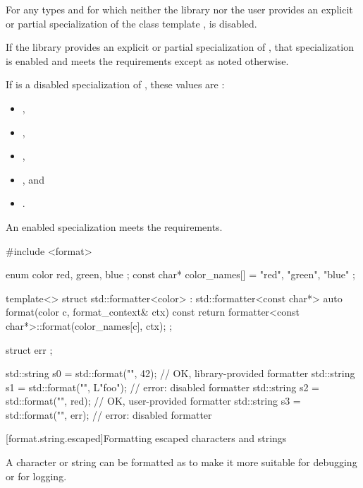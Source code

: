 \pnum
For any types  and  for which
neither the library nor the user provides
an explicit or partial specialization of
the class template ,
 is disabled.

\pnum
If the library provides an explicit or partial specialization of
, that specialization is enabled
and meets the  requirements
except as noted otherwise.

\pnum
If  is a disabled specialization of , these
values are :
\begin{itemize}
\item {},
\item {},
\item {},
\item {}, and
\item {}.
\end{itemize}

\pnum
An enabled specialization  meets the
 requirements.
\begin{example}
\begin{codeblock}
#include <format>

enum color { red, green, blue };
const char* color_names[] = { "red", "green", "blue" };

template<> struct std::formatter<color> : std::formatter<const char*> {
  auto format(color c, format_context& ctx) const {
    return formatter<const char*>::format(color_names[c], ctx);
  }
};

struct err {};

std::string s0 = std::format("{}", 42);         // OK, library-provided formatter
std::string s1 = std::format("{}", L"foo");     // error: disabled formatter
std::string s2 = std::format("{}", red);        // OK, user-provided formatter
std::string s3 = std::format("{}", err{});      // error: disabled formatter
\end{codeblock}
\end{example}

[format.string.escaped]{Formatting escaped characters and strings}

\pnum
{}%
%
A character or string can be formatted as 
to make it more suitable for debugging or for logging.

